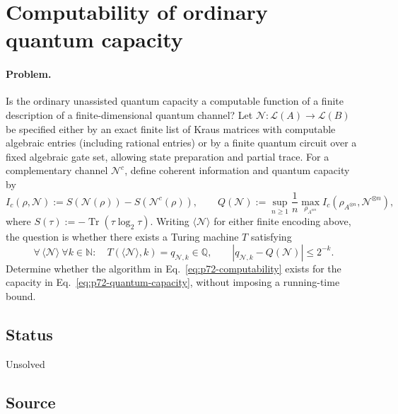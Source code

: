 \section{Computability of ordinary quantum capacity}
\label{sec:problem-72}

\paragraph{Problem.}
Is the ordinary unassisted quantum capacity a computable function of a finite
description of a finite-dimensional quantum channel?  Let
$\mathcal N:\mathcal L(A)\to\mathcal L(B)$ be specified either by an exact
finite list of Kraus matrices with computable algebraic entries (including
rational entries) or by a finite quantum circuit over a fixed algebraic gate
set, allowing state preparation and partial trace.  For a complementary
channel $\mathcal N^c$, define coherent information and quantum capacity by
\begin{equation}
  I_c(\rho,\mathcal N)
  :=S(\mathcal N(\rho))-S(\mathcal N^c(\rho)),
  \qquad
  Q(\mathcal N)
  :=\sup_{n\geq1}\frac1n
       \max_{\rho_{A^{\otimes n}}}
       I_c(\rho_{A^{\otimes n}},\mathcal N^{\otimes n}),
  \label{eq:p72-quantum-capacity}
\end{equation}
where $S(\tau):=-\operatorname{Tr}(\tau\log_2\tau)$.  Writing
$\langle\mathcal N\rangle$ for either finite encoding above, the question is
whether there exists a Turing machine $T$ satisfying
\begin{equation}
  \forall\,\langle\mathcal N\rangle\ \forall k\in\mathbb N:
  \quad
  T(\langle\mathcal N\rangle,k)=q_{\mathcal N,k}\in\mathbb Q,
  \qquad
  |q_{\mathcal N,k}-Q(\mathcal N)|\leq2^{-k}.
  \label{eq:p72-computability}
\end{equation}
Determine whether the algorithm in Eq.~\eqref{eq:p72-computability} exists
for the capacity in Eq.~\eqref{eq:p72-quantum-capacity}, without imposing a
running-time bound.

\subsection*{Status}

Unsolved

\subsection*{Source}

